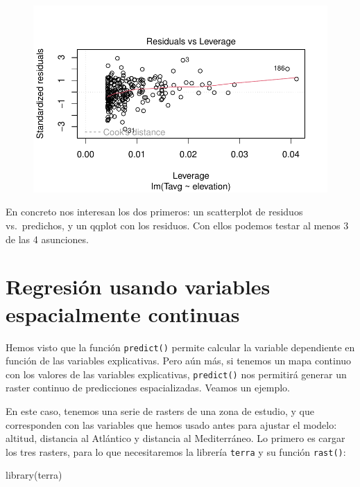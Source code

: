 \documentclass[
  letterpaper,
  DIV=11,
  numbers=noendperiod]{scrreprt}
\newenvironment{Shaded}{\begin{snugshade}}{\end{snugshade}}
\newcommand{\FunctionTok}[1]{\textcolor[rgb]{0.28,0.35,0.67}{#1}}
\newcommand{\NormalTok}[1]{\textcolor[rgb]{0.00,0.23,0.31}{#1}}
\begin{document}
\begin{figure}[H]

{\centering \includegraphics{01_RegresionLineal_files/figure-pdf/unnamed-chunk-36-4.pdf}

}

\end{figure}

En concreto nos interesan los dos primeros: un scatterplot de residuos
vs.~predichos, y un qqplot con los residuos. Con ellos podemos testar al
menos 3 de las 4 asunciones.

\hypertarget{regresiuxf3n-usando-variables-espacialmente-continuas}{%
\section{Regresión usando variables espacialmente
continuas}\label{regresiuxf3n-usando-variables-espacialmente-continuas}}

Hemos visto que la función \texttt{predict()} permite calcular la
variable dependiente en función de las variables explicativas. Pero aún
más, si tenemos un mapa continuo con los valores de las variables
explicativas, \texttt{predict()} nos permitirá generar un raster
continuo de predicciones espacializadas. Veamos un ejemplo.

En este caso, tenemos una serie de rasters de una zona de estudio, y que
corresponden con las variables que hemos usado antes para ajustar el
modelo: altitud, distancia al Atlántico y distancia al Mediterráneo. Lo
primero es cargar los tres rasters, para lo que necesitaremos la
librería \texttt{terra} y su función \texttt{rast()}:

\begin{Shaded}
\begin{Highlighting}[]
\FunctionTok{library}\NormalTok{(terra)}
\end{Highlighting}
\end{Shaded}
\end{document}
